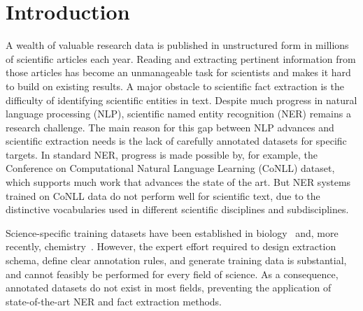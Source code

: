 \section{Introduction}
\label{sect:apner_introduction}
A wealth of valuable research data is published in unstructured form in millions of scientific articles each year. %
Reading and extracting pertinent information from those articles has
become an unmanageable task for scientists and makes
it hard to build on existing results. 
A major obstacle to scientific fact extraction is the difficulty of identifying scientific entities in text.
Despite much progress in natural language processing (NLP), 
scientific named entity recognition (NER) remains a research challenge.
The main reason for this gap between NLP advances and scientific extraction needs is the lack of carefully annotated datasets for specific targets.
In standard NER, 
progress is made possible by, for example, the 
Conference on Computational Natural Language Learning (CoNLL) dataset,
which supports much work that advances the state of the art.
But NER systems trained on CoNLL data do not perform well for scientific text, due to 
the distinctive vocabularies used in different scientific disciplines and subdisciplines.

Science-specific training datasets have been established in
biology~\cite{song2004posbiotm} and, more recently, chemistry~\cite{krallinger2015chemdner}.
However, the expert effort required to 
design 
extraction schema, 
define clear annotation rules, and generate training data %
is substantial, and cannot feasibly be performed for 
every field of science.
As a consequence, annotated datasets do not exist in most fields,
preventing the application of state-of-the-art NER and fact extraction methods.

